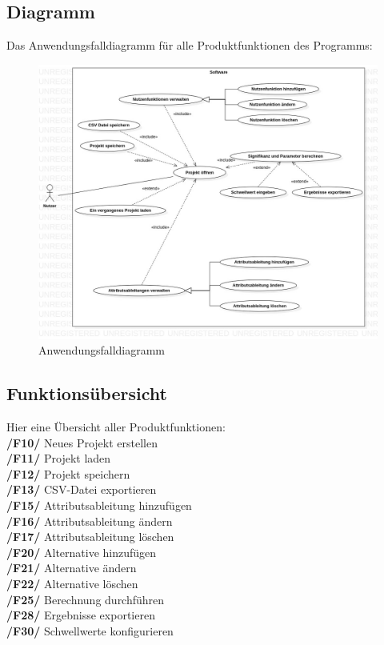 \documentclass{article}
\begin{document}
\subsection{Diagramm}
Das Anwendungsfalldiagramm für alle Produktfunktionen des Programms:
\begin{figure}[H]%
  \centering
  \includegraphics[width=15cm]{specifications/img/use-case/UseCaseDiagram6.jpg}
  \caption{Anwendungsfalldiagramm}
\end{figure} 
\newpage
\subsection{Funktionsübersicht}
Hier eine Übersicht aller Produktfunktionen: \\
[0.05in]
\textbf{/F10/} Neues Projekt erstellen \\
\textbf{/F11/} Projekt laden \\
\textbf{/F12/} Projekt speichern \\
\textbf{/F13/} CSV-Datei exportieren \\
\textbf{/F15/} Attributsableitung hinzufügen \\
\textbf{/F16/} Attributsableitung ändern \\
\textbf{/F17/} Attributsableitung löschen \\
\textbf{/F20/} Alternative hinzufügen \\
\textbf{/F21/} Alternative ändern \\
\textbf{/F22/} Alternative löschen \\
\textbf{/F25/} Berechnung durchführen \\
\textbf{/F28/} Ergebnisse exportieren \\
\textbf{/F30/} Schwellwerte konfigurieren
\\[0.2in]
\end{document}
